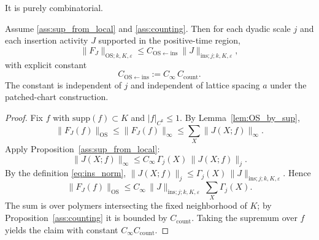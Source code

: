 It is purely combinatorial.

\begin{theorem}\label{thm:ins_to_OS}\label{lem:ins_to_OS}
Assume \ref{ass:sup_from_local} and \ref{ass:counting}. Then for each dyadic scale $j$ and each insertion activity $J$ supported in the positive-time region,
\[
\|F_J\|_{\mathrm{OS};k,K,\varepsilon}
\le C_{\mathrm{OS}\leftarrow\mathrm{ins}}\ \|J\|_{\mathrm{ins};j;k,K,\varepsilon},
\]
with explicit constant
\begin{equation}\label{eq:C_OS_ins}
C_{\mathrm{OS}\leftarrow\mathrm{ins}}
:= C_\infty\,C_{\mathrm{count}}.
\end{equation}
The constant is independent of $j$ and independent of lattice spacing $a$ under the patched-chart construction.
\end{theorem}

\begin{proof}
Fix $f$ with $\mathrm{supp}(f)\subset K$ and $|f|_{C^k}\le 1$.
By Lemma~\ref{lem:OS_by_sup},
\[
\|F_J(f)\|_{\mathrm{OS}}\le \|F_J(f)\|_\infty \le \sum_X \|J(X;f)\|_\infty.
\]
Apply Proposition~\ref{ass:sup_from_local}:
\[
\|J(X;f)\|_\infty \le C_\infty\,\Gamma_j(X)\,\|J(X;f)\|_j.
\]
By the definition \eqref{eq:ins_norm},
$\|J(X;f)\|_j\le \Gamma_j(X)\,\|J\|_{\mathrm{ins};j;k,K,\varepsilon}$.
Hence
\[
\|F_J(f)\|_{\mathrm{OS}}
\le C_\infty\,\|J\|_{\mathrm{ins};j;k,K,\varepsilon}\ \sum_X \Gamma_j(X).
\]
The sum is over polymers intersecting the fixed neighborhood of $K$; by Proposition~\ref{ass:counting} it is bounded by $C_{\mathrm{count}}$.
Taking the supremum over $f$ yields the claim with constant $C_\infty C_{\mathrm{count}}$.
\end{proof}



